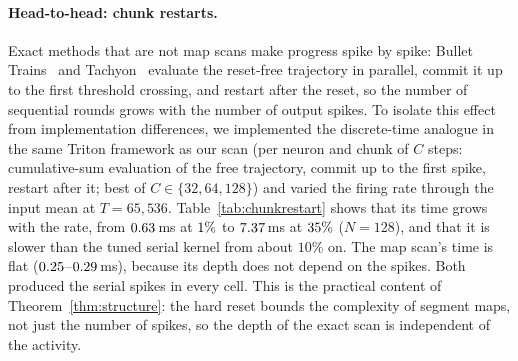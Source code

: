\documentclass[10pt]{article}
\theoremstyle{remark}
\begin{document}
\paragraph{Head-to-head: chunk restarts.}
Exact methods that are not map scans make progress spike by spike: Bullet Trains~\citep{morrill2026bullet} and Tachyon~\citep{tachyon2026} evaluate the reset-free trajectory in parallel, commit it up to the first threshold crossing, and restart after the reset, so the number of sequential rounds grows with the number of output spikes. To isolate this effect from implementation differences, we implemented the discrete-time analogue in the same Triton framework as our scan (per neuron and chunk of $C$ steps: cumulative-sum evaluation of the free trajectory, commit up to the first spike, restart after it; best of $C\in\{32,64,128\}$) and varied the firing rate through the input mean at $T=65{,}536$. Table~\ref{tab:chunkrestart} shows that its time grows with the rate, from $0.63$\,ms at $1\%$ to $7.37$\,ms at $35\%$ ($N=128$), and that it is slower than the tuned serial kernel from about $10\%$ on. The map scan's time is flat ($0.25$--$0.29$\,ms), because its depth does not depend on the spikes. Both produced the serial spikes in every cell. This is the practical content of Theorem~\ref{thm:structure}: the hard reset bounds the complexity of segment maps, not just the number of spikes, so the depth of the exact scan is independent of the activity.

\begin{table}[t]
\centering\small

\caption{Exact chunk-restart evaluation (discrete analogue of Bullet Trains/Tachyon, our Triton implementation) vs.\ the tuned serial kernel and the map scan, as a function of the firing rate ($T=65{,}536$, $\beta=0.9$, forward, RTX~5090, median ms, each method tuned per cell). All are exact in exact arithmetic.}
\label{tab:chunkrestart}
\end{table}
\end{document}

